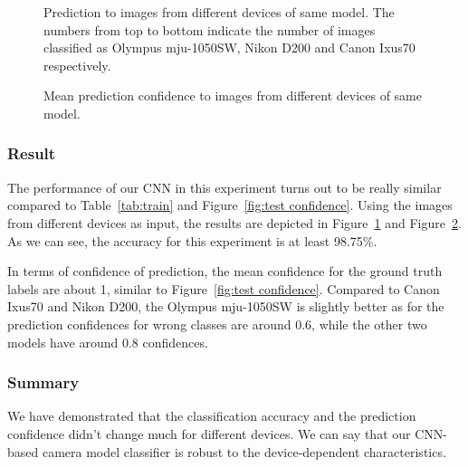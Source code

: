 \documentclass[a4paper, 9pt, twocolumn]{extarticle}
\begin{document}
\begin{figure}
	\centering
	\resizebox{!}{!}{
		{}
	}
	\caption{Prediction to images from different devices of same model. The numbers from top to bottom indicate the number of images classified as Olympus mju-1050SW, Nikon D200 and Canon Ixus70 respectively.}
	\label{fig:ins result}
\end{figure}

\begin{figure}
	\centering
	\resizebox{!}{!}{
		{}
	}
	\caption{Mean prediction confidence to images from different devices of same model.}
	\label{fig:ins confidence}
\end{figure}

\subsubsection*{Result}
\label{section:instance result}

The performance of our CNN in this experiment turns out to be really similar compared to Table~\ref{tab:train} and Figure~\ref{fig:test confidence}. Using the images from different devices as input, the results are depicted in Figure~\ref{fig:ins result} and Figure~\ref{fig:ins confidence}. As we can see, the accuracy for this experiment is at least 98.75\%.

In terms of confidence of prediction, the mean confidence for the ground truth labels are about 1, similar to Figure~\ref{fig:test confidence}. Compared to Canon Ixus70 and Nikon D200, the Olympus mju-1050SW is slightly better as for the prediction confidences for wrong classes are around 0.6, while the other two models have around 0.8 confidences.

\subsubsection*{Summary}
\label{section:instance summary}

We have demonstrated that the classification accuracy and the prediction confidence didn't change much for different devices. We can say that our CNN-based camera model classifier is robust to the device-dependent characteristics.
\end{document}
